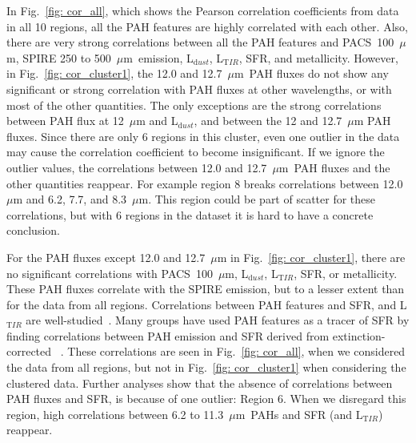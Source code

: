         In Fig.~\ref{fig: cor_all}, which shows the Pearson correlation coefficients from data in all 10 regions, all the PAH features are highly correlated with each other. 
        Also, there are very strong correlations between all the PAH features and PACS~100~$\mu$m, SPIRE 250 to 500~$\mu$m~emission, L$_{\mathrm dust}$, L$_{\mathrm TIR}$, SFR, and metallicity.
        However, in Fig.~\ref{fig: cor_cluster1}, the 12.0 and 12.7~$\mu$m~PAH fluxes do not show any significant or strong correlation with PAH fluxes at other wavelengths, or with most of the other quantities.
        The only exceptions are the strong correlations between PAH flux at 12~$\mu$m and L$_{\mathrm dust}$, and between the 12 and 12.7~$\mu$m PAH fluxes.
        Since there are only 6 regions in this cluster, even one outlier in the data may cause the correlation coefficient to become insignificant.
        If we ignore the outlier values, the correlations between 12.0 and 12.7~$\mu$m~PAH fluxes and the other quantities reappear. 
        For example region 8 breaks correlations between 12.0~$\mu$m and 6.2, 7.7, and 8.3~$\mu$m.
        This region could be part of scatter for these correlations, but with 6 regions in the dataset it is hard to have a concrete conclusion.
        
        For the PAH fluxes except 12.0 and 12.7~$\mu$m in Fig.~\ref{fig: cor_cluster1}, there are no significant correlations with PACS~100~$\mu$m, L$_{\mathrm dust}$, L$_{\mathrm TIR}$, SFR, or metallicity.
        These PAH fluxes correlate with the SPIRE emission, but to a lesser extent than for the data from all regions.
        Correlations between PAH features and SFR, and L$_{\mathrm TIR}$ are well-studied~\citep[e.g.][]{Tielens08,Peeters04}. 
        Many groups have used PAH features as a tracer of SFR by finding correlations between 
        PAH emission and SFR derived from extinction-corrected \halpha~\citep[e.g.][]{Shipley16,Khramtsova13,Calzetti07}.
        These correlations are seen in Fig.~\ref{fig: cor_all}, when we considered the data from all regions, but not in Fig.~\ref{fig: cor_cluster1} when considering the clustered data.
        Further analyses show that the absence of correlations between PAH fluxes and SFR, is because of one outlier: Region 6. 
        When we disregard this region, high correlations between 6.2 to 11.3~$\mu$m~PAHs and SFR (and L$_{\mathrm TIR}$) reappear.
        
